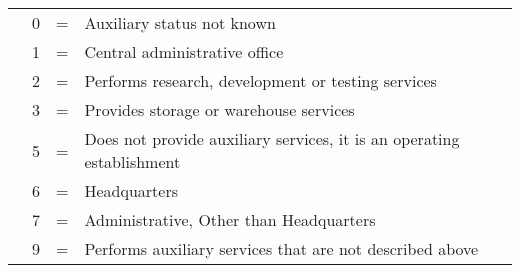 \begin{tabular}{p{1cm}rcp{10cm}}
&0 &=& Auxiliary status not known\\
&1 &=& Central administrative office\\
&2 &=& Performs research, development or testing services\\
&3 &=& Provides storage or warehouse services\\
&5 &=& Does not provide auxiliary services, it is an operating establishment\\
&6 &=& Headquarters\\
&7 &=& Administrative, Other than Headquarters\\
&9 &=& Performs auxiliary services that are not described above\\
\end{tabular}




%

